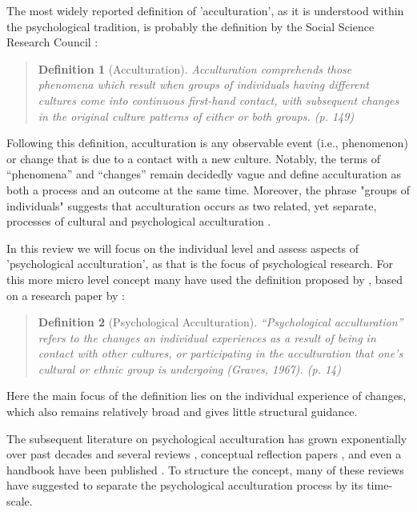 \documentclass[man, 12pt, a4paper]{apa7}
\newtheorem{definition}{Definition}
\begin{document}
The most widely reported definition of 'acculturation', as it is understood within the psychological tradition, is probably the definition by the Social Science Research Council \citep[][]{Redfield1936}:
\begin{quote}
    \begin{definition}[Acculturation]
        Acculturation comprehends those phenomena which result when groups of individuals having different cultures come into continuous first-hand contact, with subsequent changes in the original culture patterns of either or both groups. (p. 149)
    \end{definition}  
\end{quote}
Following this definition, acculturation is any observable event (i.e., phenomenon) or change that is due to a contact with a new culture. Notably, the terms of “phenomena” and “changes” remain decidedly vague and define acculturation as both a process and an outcome at the same time. Moreover, the phrase "groups of individuals" suggests that acculturation occurs as two related, yet separate, processes of cultural and psychological acculturation \citep[also see,][]{Sam2006b, Berry2005}.

In this review we will focus on the individual level and assess aspects of 'psychological acculturation', as that is the focus of psychological research. For this more micro level concept many have used the definition proposed by \citet[][]{Sam2006b}, based on a research paper by \citet{Graves1967}: 
\begin{quote}
    \begin{definition}[Psychological Acculturation]
        “Psychological acculturation” refers to the changes an individual experiences as a result of being in contact with other cultures, or participating in the acculturation that one’s cultural or ethnic group is undergoing (Graves, 1967). (p. 14)
    \end{definition}
\end{quote}
Here the main focus of the definition lies on the individual experience of changes, which also remains relatively broad and gives little structural guidance.

The subsequent literature on psychological acculturation has grown exponentially over past decades \citet{Rudmin2003a} and several reviews \citep[e.g.,][]{DeLeersnyder2017, Matsudaira2006, Celenk2011}, conceptual reflection papers \citep[e.g.,][]{Ward2012, Berry1997b}, and even a handbook have been published \citep{Sam2006a}. To structure the concept, many of these reviews have suggested to separate the psychological acculturation process by its time-scale. 
\end{document}
